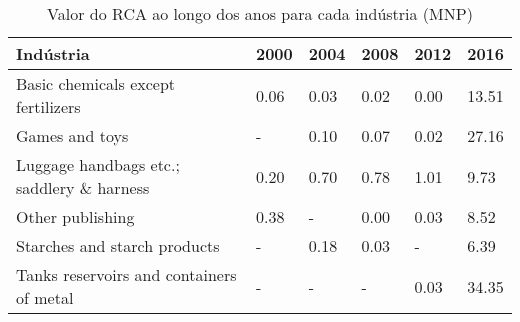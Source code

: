 \begin{table}
\centering
\caption{Valor do RCA ao longo dos anos para cada indústria (MNP)}
\label{tab:ex3-tempo-MNP}
\begin{tabular}{p{6cm}p{1.5cm}p{1.5cm}p{1.5cm}p{1.5cm}p{1.5cm}}
\toprule
                                Indústria & 2000 & 2004 & 2008 & 2012 &  2016 \\
\midrule
       Basic chemicals except fertilizers & 0.06 & 0.03 & 0.02 & 0.00 & 13.51 \\
                           Games and toys &    - & 0.10 & 0.07 & 0.02 & 27.16 \\
Luggage handbags etc.; saddlery \& harness & 0.20 & 0.70 & 0.78 & 1.01 &  9.73 \\
                         Other publishing & 0.38 &    - & 0.00 & 0.03 &  8.52 \\
             Starches and starch products &    - & 0.18 & 0.03 &    - &  6.39 \\
 Tanks reservoirs and containers of metal &    - &    - &    - & 0.03 & 34.35 \\
\bottomrule
\end{tabular}
\end{table}
